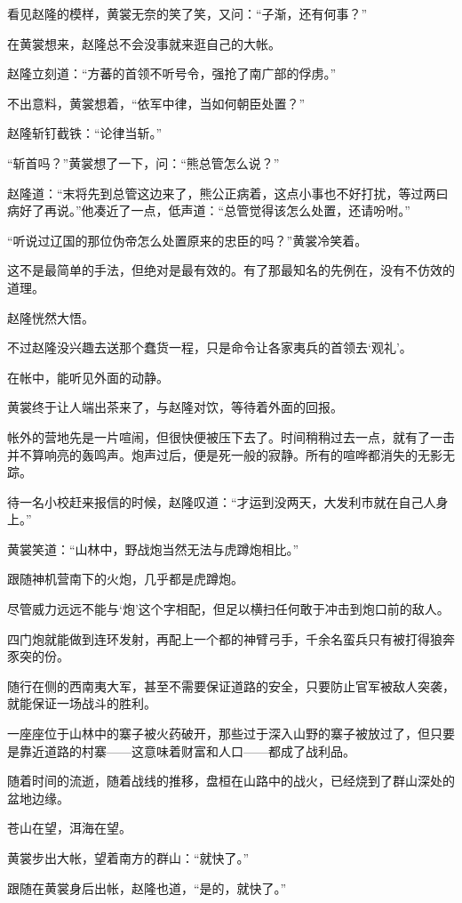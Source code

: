 看见赵隆的模样，黄裳无奈的笑了笑，又问：“子渐，还有何事？”

在黄裳想来，赵隆总不会没事就来逛自己的大帐。

赵隆立刻道：“方蕃的首领不听号令，强抢了南广部的俘虏。”

不出意料，黄裳想着，“依军中律，当如何朝臣处置？”

赵隆斩钉截铁：“论律当斩。”

“斩首吗？”黄裳想了一下，问：“熊总管怎么说？”

赵隆道：“末将先到总管这边来了，熊公正病着，这点小事也不好打扰，等过两曰病好了再说。”他凑近了一点，低声道：“总管觉得该怎么处置，还请吩咐。”

“听说过辽国的那位伪帝怎么处置原来的忠臣的吗？”黄裳冷笑着。

这不是最简单的手法，但绝对是最有效的。有了那最知名的先例在，没有不仿效的道理。

赵隆恍然大悟。

不过赵隆没兴趣去送那个蠢货一程，只是命令让各家夷兵的首领去‘观礼’。

在帐中，能听见外面的动静。

黄裳终于让人端出茶来了，与赵隆对饮，等待着外面的回报。

帐外的营地先是一片喧闹，但很快便被压下去了。时间稍稍过去一点，就有了一击并不算响亮的轰鸣声。炮声过后，便是死一般的寂静。所有的喧哗都消失的无影无踪。

待一名小校赶来报信的时候，赵隆叹道：“才运到没两天，大发利市就在自己人身上。”

黄裳笑道：“山林中，野战炮当然无法与虎蹲炮相比。”

跟随神机营南下的火炮，几乎都是虎蹲炮。

尽管威力远远不能与‘炮’这个字相配，但足以横扫任何敢于冲击到炮口前的敌人。

四门炮就能做到连环发射，再配上一个都的神臂弓手，千余名蛮兵只有被打得狼奔豕突的份。

随行在侧的西南夷大军，甚至不需要保证道路的安全，只要防止官军被敌人突袭，就能保证一场战斗的胜利。

一座座位于山林中的寨子被火药破开，那些过于深入山野的寨子被放过了，但只要是靠近道路的村寨——这意味着财富和人口——都成了战利品。

随着时间的流逝，随着战线的推移，盘桓在山路中的战火，已经烧到了群山深处的盆地边缘。

苍山在望，洱海在望。

黄裳步出大帐，望着南方的群山：“就快了。”

跟随在黄裳身后出帐，赵隆也道，“是的，就快了。”

